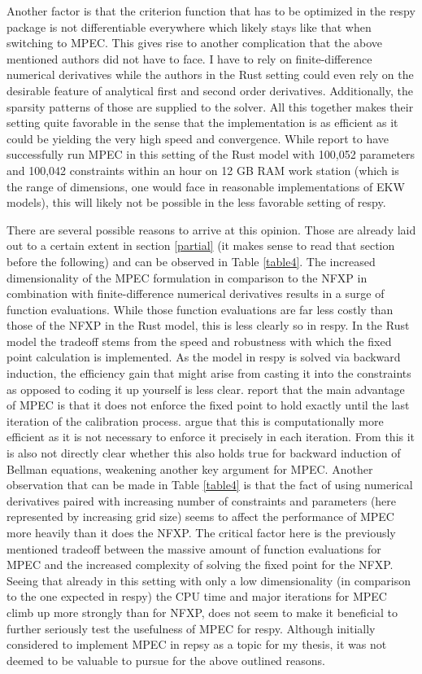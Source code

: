 Another factor is that the criterion function that has to be optimized in the respy package is not differentiable everywhere which likely stays like that when switching to MPEC. This gives rise to another complication that the above mentioned authors did not have to face. I have to rely on finite-difference numerical derivatives while the authors in the Rust setting could even rely on the desirable feature of analytical first and second order derivatives. Additionally, the sparsity patterns of those are supplied to the solver. All this together makes their setting quite favorable in the sense that the implementation is as efficient as it could be yielding the very high speed and convergence. While \cite{Su.Judd.2012} report to have successfully run MPEC in this setting of the Rust model with 100,052 parameters and 100,042 constraints within an hour on 12 GB RAM work station (which is the range of dimensions, one would face in reasonable implementations of EKW models), this will likely not be possible in the less favorable setting of respy.

There are several possible reasons to arrive at this opinion. Those are already laid out to a certain extent in section \ref{partial} (it makes sense to read that section before the following) and can be observed in Table \ref{table4}. The increased dimensionality of the MPEC formulation in comparison to the NFXP in combination with finite-difference numerical derivatives results in a surge of function evaluations. While those function evaluations are far less costly than those of the NFXP in the Rust model, this is less clearly so in respy. In the Rust model the tradeoff stems from the speed and robustness with which the fixed point calculation is implemented. As the model in respy is solved via backward induction, the efficiency gain that might arise from casting it into the constraints as opposed to coding it up yourself is less clear. \cite{Su.Judd.2012} report that the main advantage of MPEC is that it does not enforce the fixed point to hold exactly until the last iteration of the calibration process. \cite{Aguirregabiria.2002} argue that this is computationally more efficient as it is not necessary to enforce it precisely in each iteration. From this it is also not directly clear whether this also holds true for backward induction of Bellman equations, weakening another key argument for MPEC. Another observation that can be made in Table \ref{table4} is that the fact of using numerical derivatives paired with increasing number of constraints and parameters (here represented by increasing grid size) seems to affect the performance of MPEC more heavily than it does the NFXP. The critical factor here is the previously mentioned tradeoff between the massive amount of function evaluations for MPEC and the increased complexity of solving the fixed point for the NFXP. Seeing that already in this setting with only a low dimensionality (in comparison to the one expected in respy) the CPU time and major iterations for MPEC climb up more strongly than for NFXP, does not seem to make it beneficial to further seriously test the usefulness of MPEC for respy. Although initially considered to implement MPEC in repsy as a topic for my thesis, it was not deemed to be valuable to pursue for the above outlined reasons.

